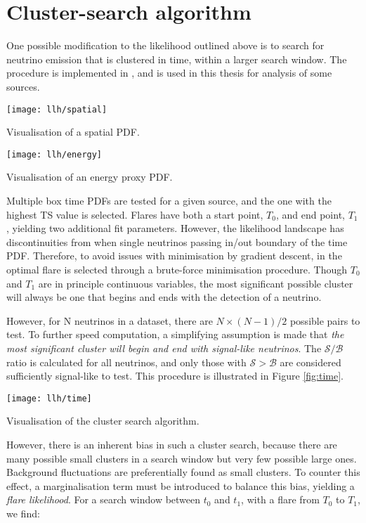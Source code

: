 \section{Cluster-search algorithm}
\label{sec:cluster_algorithm}

One possible modification to the likelihood outlined above is to search for neutrino emission that is clustered in time, within a larger search window. The procedure is implemented in  \flarestack{}, and is used in this thesis for analysis of some sources. 

\begin{marginfigure}
	\centering \texttt{[image: llh/spatial]}
	\caption{Visualisation of a spatial PDF.}
	\label{fig:spatial}
\end{marginfigure}

\begin{marginfigure}
	\centering \texttt{[image: llh/energy]}
	\caption{Visualisation of an energy proxy PDF.}
	\label{fig:energy}
\end{marginfigure}

Multiple box time PDFs are tested for a given source, and the one with the highest TS value is selected. Flares have both a start point, $T_{0}$, and end point, $T_{1}$, yielding two additional fit parameters. However, the likelihood landscape has discontinuities from when single neutrinos passing in/out boundary of the time PDF. Therefore, to avoid issues with minimisation by gradient descent, in  \flarestack{} the optimal flare is selected through a brute-force minimisation procedure. Though $T_{0}$ and $T_{1}$ are in principle continuous variables, the most significant possible cluster will always be one that begins and ends with the detection of a neutrino.

However, for N neutrinos in a dataset, there are $N \times (N-1)/2$ possible pairs to test. To further speed computation, a simplifying assumption is made that \emph{the most significant cluster will begin and end with signal-like neutrinos}. The $\mathcal{S}/\mathcal{B}$ ratio is calculated for all neutrinos, and only those with $\mathcal{S} > \mathcal{B}$ are considered sufficiently signal-like to test. This procedure is illustrated in Figure \ref{fig:time}.

\begin{marginfigure}
	\centering \texttt{[image: llh/time]}
	\caption{Visualisation of the cluster search algorithm.}
	\label{fig:time}
\end{marginfigure}

However, there is an inherent bias in such a cluster search, because there are many possible small clusters in a search window but very few possible large ones. Background fluctuations are preferentially found as small clusters. To counter this effect, a marginalisation term must be introduced to balance this bias, yielding a \emph{flare likelihood}. For a search window between $t_{0}$ and $t_{1}$, with a flare from $T_{0}$ to $T_{1}$, we find:

